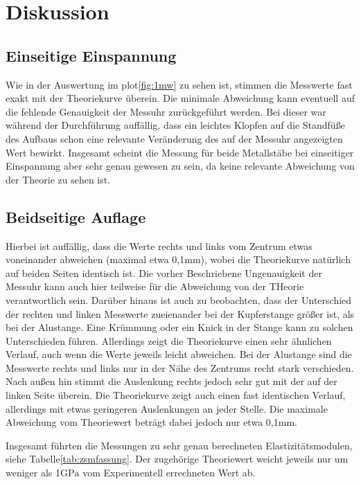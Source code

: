 \section{Diskussion}
\label{sec:Diskussion}

\subsection{Einseitige Einspannung}

Wie in der Auswertung im plot\ref{fig:1mw} zu sehen ist, stimmen die Messwerte fast exakt mit der Theoriekurve überein.
Die minimale Abweichung kann eventuell auf die fehlende Genauigkeit der Messuhr zurückgeführt werden. Bei dieser
war während der Durchführung auffällig, dass ein leichtes Klopfen auf die Standfüße des Aufbaus schon eine relevante
Veränderung des auf der Messuhr angezeigten Wert bewirkt. Insgesamt scheint die Messung für beide Metallstäbe
bei einseitiger Einspannung aber sehr genau gewesen zu sein, da keine relevante Abweichung von der Theorie zu sehen ist.

\subsection{Beidseitige Auflage}

Hierbei ist auffällig, dass die Werte rechts und links vom Zentrum etwas voneinander abweichen (maximal etwa 0,1$\si{\milli\meter}$), 
wobei die Theoriekurve 
natürlich auf beiden Seiten identisch ist. Die vorher Beschriebene Ungenauigkeit der Messuhr kann auch hier teilweise für die Abweichung
von der THeorie verantwortlich sein.
Darüber hinaus ist auch zu beobachten, dass der Unterschied der rechten und linken Messwerte zueienander bei der Kupferstange größer ist, als bei der 
Alustange. Eine Krümmung oder ein Knick in der Stange kann zu solchen Unterschieden führen. 
Allerdings zeigt die Theoriekurve einen sehr ähnlichen Verlauf, auch wenn die Werte jeweils leicht abweichen.
Bei der Alustange sind die Messwerte rechts und links nur in der Nähe des Zentrums recht stark verschieden. Nach außen hin 
stimmt die Auslenkung rechts jedoch sehr gut mit der auf der linken Seite überein. Die Theoriekurve zeigt auch einen fast identischen
Verlauf, allerdings mit etwas geringeren Auslenkungen an jeder Stelle. Die maximale Abweichung vom Theoriewert beträgt dabei jedoch 
nur etwa 0,1$\si{\milli\meter}$. 

Insgesamt führten die Messungen zu sehr genau berechneten Elastizitätsmodulen, siehe Tabelle\ref{tab:zsmfassung}. Der zugehörige
Theoriewert weicht jeweils nur um weniger als 1$\si{\giga\pascal}$ vom Experimentell errechneten Wert ab.



